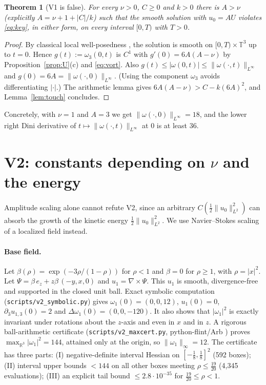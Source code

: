 \documentclass[11pt]{article}
\newcommand{\T}{\mathbb{T}^3}
\newcommand{\R}{\mathbb{R}}
\newtheorem{theorem}{Theorem}
\theoremstyle{remark}
\newcommand{\lean}[1]{\path{#1}}
\begin{document}
\begin{theorem}[V1 is false]\label{thm:v1}
For every $\nu>0$, $C\ge0$ and $k>0$ there is $A>\nu$ (explicitly $A=\nu+1+|C|/k$) such that the smooth
solution with $u_0=AU$ violates \eqref{eq:key}, in either form, on every interval $[0,T)$ with $T>0$.
\end{theorem}
\begin{proof}
By classical local well-posedness \cite{Kato1972,RRS2016}, the solution is smooth on $[0,T)\times\T$ up to
$t=0$. Hence $g(t):=\omega_3(0,t)$ is $C^1$ with $g'(0)=6A(A-\nu)$ by Proposition~\ref{prop:U}(c) and
\eqref{eq:vort}. Also $g(t)\le|\omega(0,t)|\le\|\omega(\cdot,t)\|_{L^\infty}$ and $g(0)=6A=\|\omega(\cdot,0)\|_{L^\infty}$. (Using the component $\omega_3$ avoids
differentiating $|\cdot|$.) The arithmetic lemma \lean{amplitude_exists} gives
$6A(A-\nu)>C-k(6A)^2$, and Lemma~\ref{lem:touch} concludes.
\end{proof}
Concretely, with $\nu=1$ and $A=3$ we get $\|\omega(\cdot,0)\|_{L^\infty}=18$, and the lower right Dini derivative of $t\mapsto\|\omega(\cdot,t)\|_{L^\infty}$ at $0$ is at least $36$.

\section{V2: constants depending on $\nu$ and the energy}
Amplitude scaling alone cannot refute V2, since an arbitrary $C(\tfrac12\|u_0\|_{L^2}^2)$ can absorb the growth of the kinetic energy $\tfrac12\|u_0\|_{L^2}^2$. We use
Navier--Stokes scaling of a localized field instead.

\paragraph{Base field.} Let $\beta(\rho)=\exp(-3\rho/(1-\rho))$ for $\rho<1$ and $\beta=0$ for $\rho\ge1$, with $\rho=|x|^2$.
Let $\Psi=\beta\,e_z+z\beta\,(-y,x,0)$ and $u_1=\nabla\times\Psi$. This $u_1$ is smooth, divergence-free and supported in the closed unit ball.
Exact symbolic computation (\texttt{scripts/v2\_symbolic.py}) gives $\omega_1(0)=(0,0,12)$, $u_1(0)=0$,
$\partial_3u_{1,3}(0)=2$ and $\Delta\omega_1(0)=(0,0,-120)$. It also shows that $|\omega_1|^2$ is exactly invariant under rotations
about the $z$-axis and even in $x$ and in $z$. A rigorous ball-arithmetic certificate
(\texttt{scripts/v2\_maxcert.py}, python-flint/Arb \cite{Arb2017}) proves $\max_{\R^3}|\omega_1|^2=144$, attained only at the origin, so
$\|\omega_1\|_\infty=12$. The certificate has three parts: (I) negative-definite interval Hessian on $[-\tfrac18,\tfrac18]^2$ (592 boxes);
(II) interval upper bounds $<144$ on all other boxes meeting $\rho\le\tfrac{19}{20}$ (4{,}345 evaluations);
(III) an explicit tail bound $\le2.8\cdot10^{-35}$ for $\tfrac{19}{20}\le\rho<1$.
\end{document}
